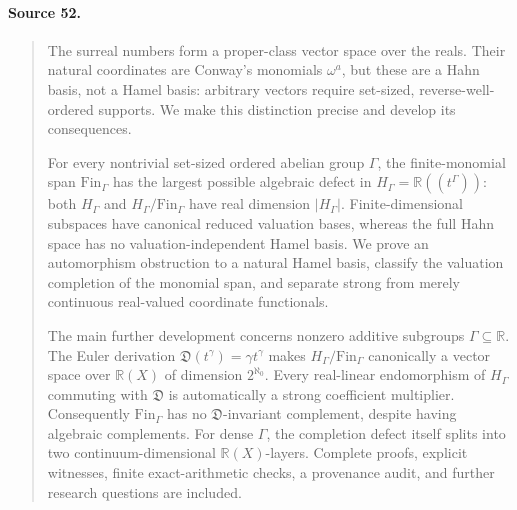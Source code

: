 \documentclass[11pt,letterpaper]{article}
\numberwithin{equation}{section}
\theoremstyle{definition}
\theoremstyle{remark}
\newcommand{\R}{\mathbb{R}}
\newcommand{\EuD}{\mathfrak D}%
\newcommand{\FinS}[1]{\mathrm{Fin}_{#1}}%
\begin{document}
\paragraph{Source 52.}
\begin{quote}\small

The surreal numbers form a proper-class vector space over the reals. Their natural coordinates are Conway's monomials $\omega^a$, but these are a Hahn basis, not a Hamel basis: arbitrary vectors require set-sized, reverse-well-ordered supports. We make this distinction precise and develop its consequences.

For every nontrivial set-sized ordered abelian group $\Gamma$, the finite-monomial span $\FinS{\Gamma}$ has the largest possible algebraic defect in $H_\Gamma=\R((t^\Gamma))$: both $H_\Gamma$ and $H_\Gamma/\FinS{\Gamma}$ have real dimension $|H_\Gamma|$. Finite-dimensional subspaces have canonical reduced valuation bases, whereas the full Hahn space has no valuation-independent Hamel basis. We prove an automorphism obstruction to a natural Hamel basis, classify the valuation completion of the monomial span, and separate strong from merely continuous real-valued coordinate functionals.

The main further development concerns nonzero additive subgroups $\Gamma\subseteq\R$. The Euler derivation $\EuD(t^\gamma)=\gamma t^\gamma$ makes $H_\Gamma/\FinS{\Gamma}$ canonically a vector space over $\R(X)$ of dimension $2^{\aleph_0}$. Every real-linear endomorphism of $H_\Gamma$ commuting with $\EuD$ is automatically a strong coefficient multiplier. Consequently $\FinS{\Gamma}$ has no $\EuD$-invariant complement, despite having algebraic complements. For dense $\Gamma$, the completion defect itself splits into two continuum-dimensional $\R(X)$-layers. Complete proofs, explicit witnesses, finite exact-arithmetic checks, a provenance audit, and further research questions are included.
\end{quote}
\end{document}
